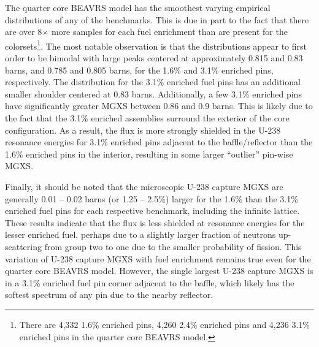 The quarter core \ac{BEAVRS} model has the smoothest varying empirical distributions of any of the benchmarks. This is due in part to the fact that there are over 8$\times$ more samples for each fuel enrichment than are present for the colorsets\footnote{There are 4,332 1.6\% enriched pins, 4,260 2.4\% enriched pins and 4,236 3.1\% enriched pins in the quarter core \ac{BEAVRS} model.}. The most notable observation is that the distributions appear to first order to be bimodal with large peaks centered at approximately 0.815 and 0.83 barns, and 0.785 and 0.805 barns, for the 1.6\% and 3.1\% enriched pins, respectively. The distribution for the 3.1\% enriched fuel pins has an additional smaller shoulder centered at 0.83 barns. Additionally, a few 3.1\% enriched pins have significantly greater \ac{MGXS} between 0.86 and 0.9 barns. This is likely due to the fact that the 3.1\% enriched assemblies surround the exterior of the core configuration. As a result, the flux is more strongly shielded in the U-238 resonance energies for 3.1\% enriched pins adjacent to the baffle/reflector than the 1.6\% enriched pins in the interior, resulting in some larger ``outlier'' pin-wise \ac{MGXS}.

Finally, it should be noted that the microscopic U-238 capture \ac{MGXS} are generally 0.01 -- 0.02 barns (or 1.25 -- 2.5\%) larger for the 1.6\% than the 3.1\% enriched fuel pins for each respective benchmark, including the infinite lattice. These results indicate that the flux is less shielded at resonance energies for the lesser enriched fuel, perhaps due to a slightly larger fraction of neutrons up-scattering from group two to one due to the smaller probability of fission. This variation of U-238 capture \ac{MGXS} with fuel enrichment remains true even for the quarter core \ac{BEAVRS} model. However, the single largest U-238 capture \ac{MGXS} is in a 3.1\% enriched fuel pin corner adjacent to the baffle, which likely has the softest spectrum of any pin due to the nearby reflector.



